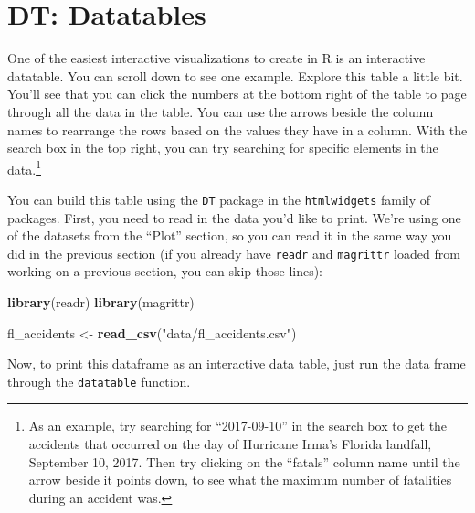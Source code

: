 \documentclass[]{tufte-book}
\newenvironment{Shaded}{}{}
\newcommand{\KeywordTok}[1]{\textcolor[rgb]{0.00,0.44,0.13}{\textbf{#1}}}
\newcommand{\NormalTok}[1]{#1}
\newcommand{\OperatorTok}[1]{\textcolor[rgb]{0.40,0.40,0.40}{#1}}
\newcommand{\StringTok}[1]{\textcolor[rgb]{0.25,0.44,0.63}{#1}}
\begin{document}
\hypertarget{dt-datatables}{%
\section{DT: Datatables}\label{dt-datatables}}

One of the easiest interactive visualizations to create in R is an interactive datatable.
You can scroll down to see one example. Explore this table a little bit. You'll
see that you can click the numbers at the bottom right of the table to page through all
the data in the table. You can use the arrows beside the column names to rearrange
the rows based on the values they have in a column. With the search box in the top right,
you can try searching for specific elements in the data.\footnote{As an example, try searching for
  ``2017-09-10'' in the search box to get the accidents that occurred on the day of Hurricane
  Irma's Florida landfall, September 10, 2017. Then try clicking on the ``fatals'' column
  name until the arrow beside it points down, to see what the maximum number of fatalities
  during an accident was.}

You can build this table using the \texttt{DT} package in the \texttt{htmlwidgets} family of packages.
First, you need to read in the data you'd like to print. We're using one of the datasets
from the ``Plot'' section, so you can read it in the same way you did in the previous section
(if you already have \texttt{readr} and \texttt{magrittr} loaded from working on a previous section,
you can skip those lines):

\begin{Shaded}
\begin{Highlighting}[]
\KeywordTok{library}\NormalTok{(readr)}
\KeywordTok{library}\NormalTok{(magrittr)}

\NormalTok{fl_accidents <-}\StringTok{ }\KeywordTok{read_csv}\NormalTok{(}\StringTok{"data/fl_accidents.csv"}\NormalTok{)}
\end{Highlighting}
\end{Shaded}

Now, to print this dataframe as an interactive data table, just run the data frame through
the \texttt{datatable} function.

\begin{Shaded}
\end{Shaded}
\end{document}
